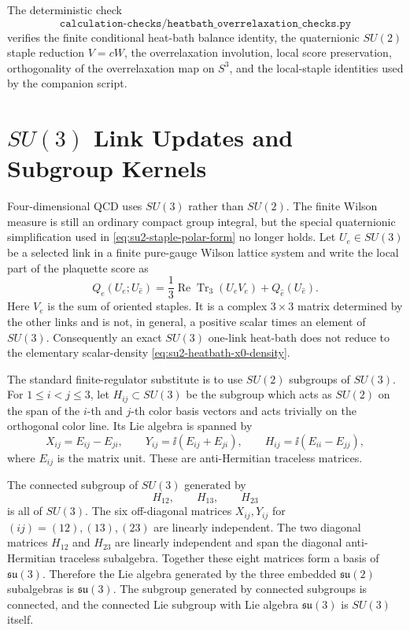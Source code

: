 The deterministic check
\[
  \texttt{calculation-checks/heatbath\_overrelaxation\_checks.py}
\]
verifies the finite conditional heat-bath balance identity, the quaternionic
\(SU(2)\) staple reduction \(V=cW\), the overrelaxation involution, local
score preservation, orthogonality of the overrelaxation map on \(S^3\), and
the local-staple identities used by the companion script.

\section{\texorpdfstring{\(SU(3)\)}{SU(3)} Link Updates and Subgroup Kernels}
\label{sec:su3-link-updates-subgroup-kernels}

Four-dimensional QCD uses \(SU(3)\) rather than \(SU(2)\).  The finite
Wilson measure is still an ordinary compact group integral, but the special
quaternionic simplification used in \eqref{eq:su2-staple-polar-form} no
longer holds.  Let \(U_e\in SU(3)\) be a selected link in a finite pure-gauge
Wilson lattice system and write the local part of the plaquette score as
\begin{equation}
  Q_e(U_e;U_{\widehat e})
  =
  \frac13\operatorname{Re}\operatorname{Tr}_3(U_eV_e)
  +Q_{\widehat e}(U_{\widehat e}).
  \label{eq:su3-local-staple-score}
\end{equation}
Here \(V_e\) is the sum of oriented staples.  It is a complex \(3\times3\)
matrix determined by the other links and is not, in general, a positive scalar
times an element of \(SU(3)\).  Consequently an exact \(SU(3)\) one-link
heat-bath does not reduce to the elementary scalar-density
\eqref{eq:su2-heatbath-x0-density}.

The standard finite-regulator substitute is to use \(SU(2)\) subgroups of
\(SU(3)\).  For \(1\le i<j\le3\), let \(H_{ij}\subset SU(3)\) be the subgroup
which acts as \(SU(2)\) on the span of the \(i\)-th and \(j\)-th color basis
vectors and acts trivially on the orthogonal color line.  Its Lie algebra is
spanned by
\[
  X_{ij}=E_{ij}-E_{ji},\qquad
  Y_{ij}=\ii(E_{ij}+E_{ji}),\qquad
  H_{ij}=\ii(E_{ii}-E_{jj}),
\]
where \(E_{ij}\) is the matrix unit.  These are anti-Hermitian traceless
matrices.

The connected subgroup of \(SU(3)\) generated by
\[
  H_{12},\qquad H_{13},\qquad H_{23}
\]
is all of \(SU(3)\).
The six off-diagonal matrices \(X_{ij},Y_{ij}\) for
\((ij)=(12),(13),(23)\) are linearly independent.  The two diagonal matrices
\(H_{12}\) and \(H_{23}\) are linearly independent and span the diagonal
anti-Hermitian traceless subalgebra.  Together these eight matrices form a
basis of \(\mathfrak{su}(3)\).  Therefore the Lie algebra generated by the
three embedded \(\mathfrak{su}(2)\) subalgebras is \(\mathfrak{su}(3)\).  The
subgroup generated by connected subgroups is connected, and the connected
Lie subgroup with Lie algebra \(\mathfrak{su}(3)\) is \(SU(3)\) itself.

